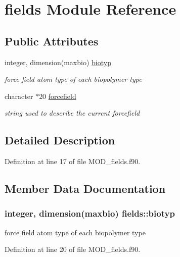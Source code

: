 \hypertarget{classfields}{\section{fields Module Reference}
\label{classfields}
}
\subsection*{Public Attributes}
\begin{DoxyCompactItemize}
\item 
integer, dimension(maxbio) \hyperlink{classfields_a7d1f16a576de9739a3c2ea2a30a0a68d}{biotyp}
\begin{DoxyCompactList}\small\item\em force field atom type of each biopolymer type \end{DoxyCompactList}\item 
character $\ast$20 \hyperlink{classfields_ab26757b26ed2dd825a8f566c3bed28f2}{forcefield}
\begin{DoxyCompactList}\small\item\em string used to describe the current forcefield \end{DoxyCompactList}\end{DoxyCompactItemize}


\subsection{Detailed Description}


Definition at line 17 of file M\-O\-D\-\_\-fields.\-f90.



\subsection{Member Data Documentation}
\hypertarget{classfields_a7d1f16a576de9739a3c2ea2a30a0a68d}{
\subsubsection[{biotyp}]{\setlength{\rightskip}{0pt plus 5cm}integer, dimension(maxbio) fields\-::biotyp}}\label{classfields_a7d1f16a576de9739a3c2ea2a30a0a68d}


force field atom type of each biopolymer type 



Definition at line 20 of file M\-O\-D\-\_\-fields.\-f90.

